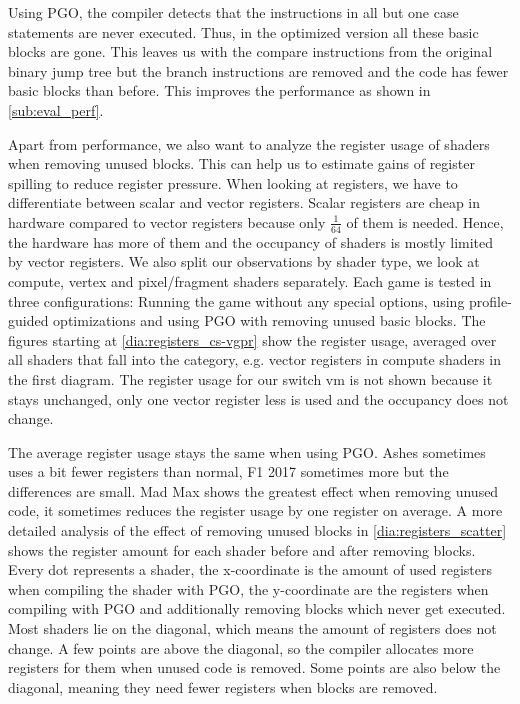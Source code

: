 Using PGO, the compiler detects that the instructions in all but one case statements are never executed.
Thus, in the optimized version all these basic blocks are gone.
This leaves us with the compare instructions from the original binary jump tree but the branch instructions are removed and the code has fewer basic blocks than before.
This improves the performance as shown in \cref{sub:eval_perf}.

Apart from performance, we also want to analyze the register usage of shaders when removing unused blocks.
This can help us to estimate gains of register spilling to reduce register pressure.
When looking at registers, we have to differentiate between scalar and vector registers.
Scalar registers are cheap in hardware compared to vector registers because only $\frac{1}{64}$ of them is needed.
Hence, the hardware has more of them and the occupancy of shaders is mostly limited by vector registers.
We also split our observations by shader type, we look at compute, vertex and pixel/fragment shaders separately.
Each game is tested in three configurations: Running the game without any special options, using profile-guided optimizations and using PGO with removing unused basic blocks.
The figures starting at \cref{dia:registers_cs-vgpr} show the register usage, averaged over all shaders that fall into the category, e.g. vector registers in compute shaders in the first diagram.
The register usage for our switch vm is not shown because it stays unchanged, only one vector register less is used and the occupancy does not change.


The average register usage stays the same when using PGO. Ashes sometimes uses a bit fewer registers than normal, F1 2017 sometimes more but the differences are small.
Mad Max shows the greatest effect when removing unused code, it sometimes reduces the register usage by one register on average.
A more detailed analysis of the effect of removing unused blocks in \cref{dia:registers_scatter} shows the register amount for each shader before and after removing blocks.
Every dot represents a shader, the x-coordinate is the amount of used registers when compiling the shader with PGO, the y-coordinate are the registers when compiling with PGO and additionally removing blocks which never get executed.
Most shaders lie on the diagonal, which means the amount of registers does not change.
A few points are above the diagonal, so the compiler allocates more registers for them when unused code is removed.
Some points are also below the diagonal, meaning they need fewer registers when blocks are removed.


